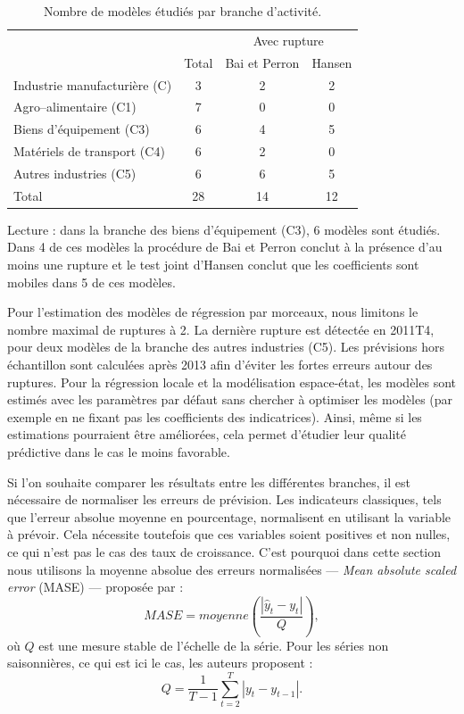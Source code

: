 \documentclass[
  a4paper,
  DIV=11,
  numbers=noendperiod,
  french]{scrartcl}
\newcommand\1{{\mathds 1}}
\theoremstyle{remark}
\begin{document}
\begin{longtable}{l|ccc}

\caption{\label{tbl-nb-models}Nombre de modèles étudiés par branche
d'activité.}

\tabularnewline

\toprule
\multicolumn{1}{l}{} &  & \multicolumn{2}{c}{Avec rupture} \\ 
\cmidrule(lr){3-4}
\multicolumn{1}{l}{} & Total & Bai et Perron & Hansen \\ 
\midrule\addlinespace[2.5pt]
Industrie manufacturière (C) & 3 & 2 & 2 \\ 
Agro–alimentaire (C1) & 7 & 0 & 0 \\ 
Biens d'équipement (C3) & 6 & 4 & 5 \\ 
Matériels de transport (C4) & 6 & 2 & 0 \\ 
Autres industries (C5) & 6 & 6 & 5 \\ 
\midrule 
\midrule 
Total & 28 & 14 & 12 \\ 
\bottomrule

\end{longtable}

Lecture : dans la branche des biens d'équipement (C3), 6 modèles sont
étudiés. Dans 4 de ces modèles la procédure de Bai et Perron conclut à
la présence d'au moins une rupture et le test joint d'Hansen conclut que
les coefficients sont mobiles dans 5 de ces modèles.

Pour l'estimation des modèles de régression par morceaux, nous limitons
le nombre maximal de ruptures à 2. La dernière rupture est détectée en
2011T4, pour deux modèles de la branche des autres industries (C5). Les
prévisions hors échantillon sont calculées après 2013 afin d'éviter les
fortes erreurs autour des ruptures. Pour la régression locale et la
modélisation espace-état, les modèles sont estimés avec les paramètres
par défaut sans chercher à optimiser les modèles (par exemple en ne
fixant pas les coefficients des indicatrices). Ainsi, même si les
estimations pourraient être améliorées, cela permet d'étudier leur
qualité prédictive dans le cas le moins favorable.

Si l'on souhaite comparer les résultats entre les différentes branches,
il est nécessaire de normaliser les erreurs de prévision. Les
indicateurs classiques, tels que l'erreur absolue moyenne en
pourcentage, normalisent en utilisant la variable à prévoir. Cela
nécessite toutefois que ces variables soient positives et non nulles, ce
qui n'est pas le cas des taux de croissance. C'est pourquoi dans cette
section nous utilisons la moyenne absolue des erreurs normalisées ---
\emph{Mean absolute scaled error} (MASE) --- proposée par
\textcite{HYNDMAN2006679} : \[
MASE=moyenne\left(\frac{|{\hat y}_{t} - y_t|}{Q}\right),
\] où \(Q\) est une mesure stable de l'échelle de la série. Pour les
séries non saisonnières, ce qui est ici le cas, les auteurs proposent :
\[
Q=\frac{1}{T-1}\sum_{t=2}^T|y_t-y_{t-1}|.
\]
\end{document}
